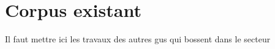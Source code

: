\section{Corpus existant}

Il faut mettre ici les travaux des autres gus qui bossent dans le secteur
